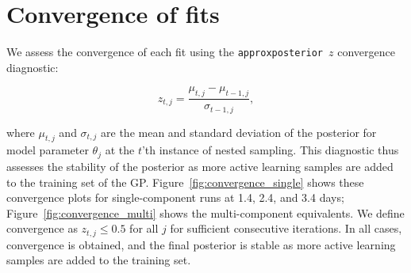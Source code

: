 \documentclass[twocolumn,twocolappendix]{aastex63}
\def\approxposterior{\texttt{approxposterior}}
\begin{document}
\section{Convergence of fits}\label{app:convergence}

We assess the convergence of each fit using the \approxposterior~$z$ convergence diagnostic:

\begin{equation}
    z_{t,j} = \frac{\mu_{t,j} - \mu_{t-1,j}}{\sigma_{t-1,j}},
\end{equation}\label{eqn:convergence_z}

\noindent where $\mu_{t,j}$ and $\sigma_{t,j}$ are the mean and standard deviation of the posterior for model parameter $\theta_j$ at the $t$'th instance of nested sampling. This diagnostic thus assesses the stability of the posterior as more active learning samples are added to the training set of the GP. Figure~\ref{fig:convergence_single} shows these convergence plots for single-component runs at 1.4, 2.4, and 3.4 days; Figure~\ref{fig:convergence_multi} shows the multi-component equivalents. We define convergence as $z_{t,j} \leqslant 0.5$ for all $j$ for sufficient consecutive iterations. In all cases, convergence is obtained, and the final posterior is stable as more active learning samples are added to the training set.
\end{document}
